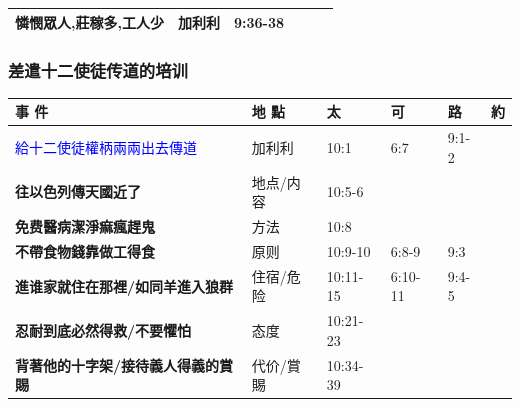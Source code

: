 \begin{table}[H]
\begin{tabular}{p{13.07em}|p{8.43em}|p{5.285em}|p{5.57em}|p{5.285em}|p{4.855em}}
\textbf{憐憫眾人,莊稼多,工人少} & 加利利   & 9:36-38&  &  & \multicolumn{1}{r}{} \\ \midrule
\end{tabular}%
\end{table}%

\subsubsection{差遣十二使徒传道的培训}
\begin{table}[H]
\centering 
\begin{tabular}{p{17.07em}|p{8.43em}|p{5.285em}|p{5em}|p{4.285em}|p{1.855em}}\toprule
\textbf{事 件} & \textbf{地 點} & \textbf{太} & \textbf{可} & \textbf{路} & \textbf{約} \\\midrule

\textcolor{blue}{給十二使徒權柄兩兩出去傳道} & 加利利   & 10:1& 6:7& 9:1-2& \multicolumn{1}{r}{} \\ \midrule
\textbf{往以色列傳天國近了} &地点/内容& 10:5-6 &  &  & \multicolumn{1}{r}{} \\ \midrule
\textbf{免费醫病潔淨痲瘋趕鬼} &方法& 10:8& & & \multicolumn{1}{r}{} \\ \midrule
\textbf{不帶食物錢靠做工得食} & 原则& 10:9-10& 6:8-9& 9:3 & \multicolumn{1}{r}{} \\ \midrule
\textbf{進谁家就住在那裡/如同羊進入狼群} &住宿/危险 & 10:11-15& 6:10-11& 9:4-5 & \multicolumn{1}{r}{} \\ \midrule

\textbf{忍耐到底必然得救/不要懼怕} &态度& 10:21-23&& & \multicolumn{1}{r}{} \\ \midrule
\textbf{背著他的十字架/接待義人得義的賞賜} &代价/賞賜&10:34-39&  && \multicolumn{1}{r}{} \\ \midrule
\end{tabular}%
\end{table}%

